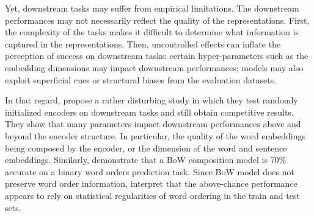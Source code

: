 Yet, downstream tasks may suffer from empirical limitations. The downstream performances may not necessarily reflect the quality of the representations. First, the complexity of the tasks makes it difficult to determine what information is captured in the representations. Then, uncontrolled effects can inflate the perception of success on downstream tasks: certain hyper-parameters such as the embedding dimensions may impact downstream performances; models may also exploit superficial cues or structural biases from the evaluation datasets.

In that regard, \textcite{wieting_19} propose a rather disturbing study in which they test randomly initialized encoders on downstream tasks and still obtain competitive results. They show that many parameters impact downstream performances above and beyond the encoder structure. In particular, the quality of the word embeddings being composed by the encoder, or the dimension of the word and sentence embeddings. Similarly, \textcite{adi_17} demonstrate that a BoW composition model is 70\% accurate on a binary word orders prediction task. Since BoW model does not preserve word order information, \textcite{ettinger_18} interpret that the above-chance performance appears to rely on statistical regularities of word ordering in the train and test sets.

